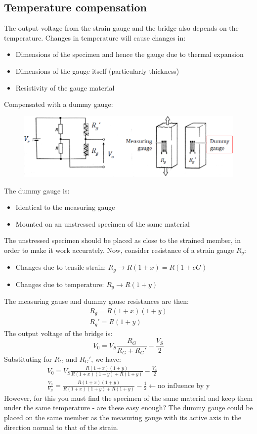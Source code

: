 \documentclass[class=report, crop=false, 12pt,a4paper]{standalone}
\begin{document}
\subsection{Temperature compensation}
The output voltage from the strain gauge and the bridge also depends on the temperature. Changes in temperature will cause changes in:
\begin{itemize}
  \item Dimensions of the specimen and hence the gauge due to thermal expansion
  \item Dimensions of the gauge itself (particularly thickness)
  \item Resistivity of the gauge material
\end{itemize}
Compensated with a dummy gauge:
\begin{figure}[H]
  \centering
  \includegraphics[width = 0.8 \textwidth]{../img/diagram13.png}
\end{figure}
The dummy gauge is:
\begin{itemize}
  \item Identical to the measuring gauge
  \item Mounted on an unstressed specimen of the same material
\end{itemize}
The unstressed specimen should be placed as close to the strained member, in order to make it work accurately. Now, consider resistance of a strain gauge $R_g$:
\begin{itemize}
  \item Changes due to tensile strain: $R_g \rightarrow R(1+x) = R(1+eG)$
  \item Changes due to temperature: $R_g \rightarrow R(1+y)$
\end{itemize}
The measuring gause and dummy gause resistances are then: 
\begin{align}
  R_g = R(1+x)(1+y) \\
  R_g' = R(1+y)
\end{align}
The output voltage of the bridge is: 
\begin{equation}
  V_0 = V_S \frac{R_G}{R_G + R_G'} - \frac{V_S}{2}
\end{equation}
Substituting for $R_G$ and $R_G'$, we have:
\begin{gather}
  V_0 = V_S \frac{R(1+x)(1+y)}{R(1+x)(1+y) + R(1+y)} - \frac{V_S}{2}\\
  \frac{V_0}{V_S} = \frac{R(1+x)(1+y)}{R(1+x)(1+y) + R(1+y)} - \frac{1}{2} \leftarrow \textrm{no influence by y}
\end{gather}
However, for this you must find the specimen of the same material and keep them under the same temperature - are these easy enough? The dummy gauge could be placed on the same member as the measuring gauge with its active axis in the direction normal to that of the strain.
\end{document}
